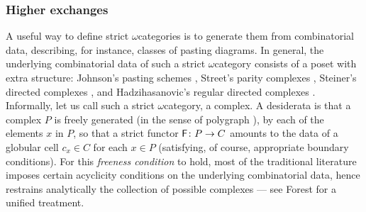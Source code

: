 \subsubsection*{Higher exchanges}

A useful way to define strict \( \omega \)\nbd categories is to generate them from combinatorial data, describing, for instance, classes of pasting diagrams.
In general, the underlying combinatorial data of such a strict \( \omega \)\nbd category consists of a poset with extra structure: Johnson's pasting schemes \cite{johnson1989pasting}, Street's parity complexes \cite{street1991parity}, Steiner's directed complexes \cite{steiner1993algebra}, and Hadzihasanovic's regular directed complexes \cite{hadzihasanovic2024combinatorics}.
Informally, let us call such a strict \( \omega \)\nbd category, a complex. 
A desiderata is that a complex \( P \) is freely generated (in the sense of polygraph \cite{burroni1993higher}), by each of the elements \( x \) in \( P \), so that a strict functor \( \mathsf{F} \colon P \to C \) amounts to the data of a globular cell \( c_x \in C \) for each \( x \in P \) (satisfying, of course, appropriate boundary conditions).
For this \emph{freeness condition} to hold, most of the traditional literature imposes certain acyclicity conditions on the underlying combinatorial data, hence restrains analytically the collection of possible complexes --- see Forest \cite{forest2022pasting} for a unified treatment.

